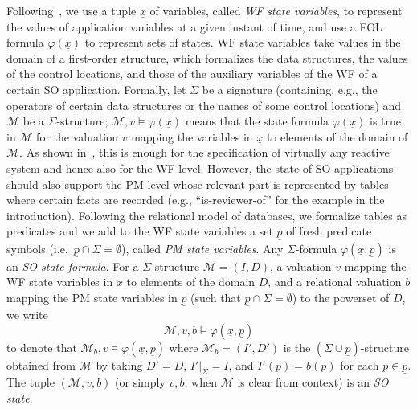 \documentclass[conference]{IEEEtran}
\begin{document}
Following~\cite{manna-pnueli-book}, we use a tuple $\underline{x}$ of
variables, called \emph{WF state variables}, to represent the values
of application variables at a given instant of time, and use a FOL
formula $\varphi(\underline{x})$ to represent sets of states.  WF
state variables take values in the domain of a first-order structure,
which formalizes the data structures, the values of the control
locations, and those of the auxiliary variables of the WF of a certain
SO application.  Formally, let $\Sigma$ be a signature (containing,
e.g., the operators of certain data structures or the names of some
control locations) and $\mathcal{M}$ be a $\Sigma$-structure;
$\mathcal{M}, v\models \varphi(\underline{x})$ means that the state
formula $\varphi(\underline{x})$ is true in $\mathcal{M}$ for the
valuation $v$ mapping the variables in $\underline{x}$ to elements
of the domain of $\mathcal{M}$.  As shown in~\cite{manna-pnueli-book},
this is enough for the specification of virtually any reactive system
and hence also for the WF level.  However, the state of SO
applications should also support the PM level whose relevant part is
represented by tables where certain facts are recorded (e.g.,
``is-reviewer-of'' for the example in the introduction).  Following
the relational model of databases, we formalize tables as predicates
and we add to the WF state variables a set $\underline{p}$ of fresh
predicate symbols (i.e.\ $\underline{p}\cap \Sigma=\emptyset$), called
\emph{PM state variables}.  Any $\Sigma$-formula
$\varphi(\underline{x},\underline{p})$ is an \emph{SO state formula}. 
For a $\Sigma$-structure $\mathcal{M}=(I,D)$, a valuation $v$ mapping
the WF state variables in $\underline{x}$ to elements of the
domain $D$, and a relational valuation $b$ mapping the PM state
variables in $\underline{p}$ (such that $\underline{p}\cap
\Sigma=\emptyset$) to the powerset of $D$, we write 
\begin{displaymath}
\mathcal{M}, v, b\models \varphi(\underline{x},\underline{p})
\end{displaymath}
to denote that $\mathcal{M}_{b},
v\models \varphi(\underline{x},\underline{p})$ where
$\mathcal{M}_{b}=(I',D')$ is the $(\Sigma\cup
\underline{p})$-structure obtained from $\mathcal{M}$ by taking
$D'=D$, $I'|_{\Sigma} = I$, and $I'(p)=b(p)$ for each $p\in
\underline{p}$.  The tuple $(\mathcal{M},v,b)$ (or simply $v,b$, when
$\mathcal{M}$ is clear from context) is an \emph{SO state}.
\end{document}
